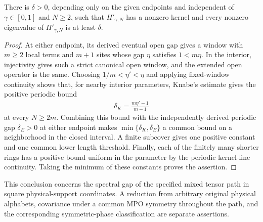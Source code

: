 \begin{lemma}
    \label{thm:mpo_mixed_uniform_periodic_path_gap}
    \leanok
    There is $\delta>0$, depending only on the given endpoints and
    independent of $\gamma\in[0,1]$ and $N\geq2$,
    such that $H'_{\gamma,N}$ has a nonzero kernel and every nonzero
    eigenvalue of $H'_{\gamma,N}$ is at least $\delta$.
\end{lemma}
\begin{proof}
    \leanok
    At either endpoint, its derived eventual open gap gives a window
    with $m\geq2$ local terms and $m+1$ sites whose gap $\eta$ satisfies
    $1<m\eta$. In the interior, injectivity gives such a strict
    canonical open window, and the extended open operator is the same.
    Choosing $1/m<\eta'<\eta$ and applying fixed-window continuity shows
    that, for nearby interior parameters, Knabe's estimate gives the positive
    periodic bound
    \begin{align}
        \delta_K=\frac{m\eta'-1}{m-1}
    \end{align}
    at every $N\geq2m$. Combining this bound with the independently
    derived periodic gap $\delta_E>0$ at either endpoint makes
    $\min\{\delta_K,\delta_E\}$ a common bound on a neighborhood
    in the closed interval. A finite subcover gives one positive
    constant and one common lower length threshold. Finally, each of
    the finitely many shorter rings has a positive bound uniform in
    the parameter by the periodic kernel-line continuity.
    Taking the minimum of these constants proves the assertion.
\end{proof}

This conclusion concerns the spectral gap of the specified mixed tensor
path in square physical-support coordinates. A reduction from arbitrary
original physical alphabets, covariance under a common MPO symmetry
throughout the path, and the corresponding symmetric-phase classification
are separate assertions.
